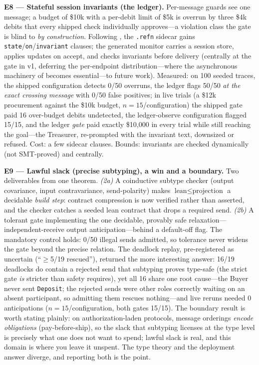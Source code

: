 \documentclass{article}
\begin{document}
\textbf{E8 --- Stateful session invariants (the ledger).} Per-message guards see one message; a budget of \$10k with a per-debit limit of \$5k is overrun by three \$4k debits that every shipped check individually approves---a violation class the gate is blind to \emph{by construction}. Following \citet{chen12}, the \texttt{.refn} sidecar gains \texttt{state}/\texttt{on}/\texttt{invariant} clauses; the generated monitor carries a session store, applies updates on accept, and checks invariants before delivery (centrally at the gate in v1, deferring the per-endpoint distribution---where the asynchronous machinery of \citet{chen12} becomes essential---to future work). Measured: on 100 seeded traces, the shipped configuration detects 0/50 overruns, the ledger flags 50/50 \emph{at the exact crossing message} with 0/50 false positives; in live trials (a \$12k procurement against the \$10k budget, $n{=}15$/configuration) the shipped gate paid 16 over-budget debits undetected, the ledger-observe configuration flagged 15/15, and the ledger \emph{gate} paid exactly \$10{,}000 in every trial while still reaching the goal---the Treasurer, re-prompted with the invariant text, downsized or refused. Cost: a few sidecar clauses. Bounds: invariants are checked dynamically (not SMT-proved) and centrally.

\textbf{E9 --- Lawful slack (precise subtyping), a win and a boundary.} Two deliverables from one theorem. \emph{(2a)} A coinductive subtype checker (output covariance, input contravariance, send-polarity) makes $\text{lean} \leq \text{projection}$ a decidable \emph{build step}: contract compression is now verified rather than asserted, and the checker catches a seeded lean contract that drops a required send. \emph{(2b)} A tolerant gate implementing the one decidable, provably safe relaxation---independent-receive output anticipation---behind a default-off flag. The mandatory control holds: 0/50 illegal sends admitted, so tolerance never widens the gate beyond the precise relation. The deadlock replay, pre-registered as uncertain (``$\geq$5/19 rescued''), returned the more interesting answer: 16/19 deadlocks do contain a rejected send that subtyping proves type-safe (the strict gate \emph{is} stricter than safety requires), yet all 16 share one root cause---the Buyer never sent \texttt{Deposit}; the rejected sends were other roles correctly waiting on an absent participant, so admitting them rescues nothing---and live reruns needed 0 anticipations ($n{=}15$/configuration, both gates 15/15). The boundary result is worth stating plainly: on authorization-laden protocols, message orderings \emph{encode obligations} (pay-before-ship), so the slack that subtyping licenses at the type level is precisely what one does not want to spend; lawful slack is real, and this domain is where you leave it unspent. The type theory and the deployment answer diverge, and reporting both is the point.
\end{document}
